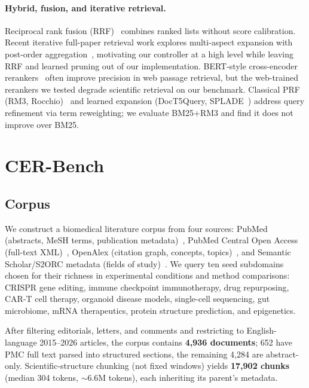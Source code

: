 \documentclass{article}
\begin{document}
\paragraph{Hybrid, fusion, and iterative retrieval.}
Reciprocal rank fusion (RRF)~\cite{rrf2009} combines ranked lists without score calibration. Recent iterative full-paper retrieval work explores multi-aspect expansion with post-order aggregation~\cite{cor2025}, motivating our controller at a high level while leaving RRF and learned pruning out of our implementation. BERT-style cross-encoder rerankers~\cite{nogueira2019bert} often improve precision in web passage retrieval, but the web-trained rerankers we tested degrade scientific retrieval on our benchmark. Classical PRF (RM3, Rocchio)~\cite{robertson2009} and learned expansion (DocT5Query, SPLADE~\cite{splade2022}) address query refinement via term reweighting; we evaluate BM25+RM3 and find it does not improve over BM25.

\section{CER-Bench}
\label{sec:benchmark}

\subsection{Corpus}

We construct a biomedical literature corpus from four sources: PubMed (abstracts, MeSH terms, publication metadata)~\cite{pubmed_nlm}, PubMed Central Open Access (full-text XML)~\cite{pmc_nlm}, OpenAlex (citation graph, concepts, topics)~\cite{openalex2022}, and Semantic Scholar/S2ORC metadata (fields of study)~\cite{s2orc2020}. We query ten seed subdomains chosen for their richness in experimental conditions and method comparisons: CRISPR gene editing, immune checkpoint immunotherapy, drug repurposing, CAR-T cell therapy, organoid disease models, single-cell sequencing, gut microbiome, mRNA therapeutics, protein structure prediction, and epigenetics.

After filtering editorials, letters, and comments and restricting to English-language 2015--2026 articles, the corpus contains \textbf{4{,}936 documents}; 652 have PMC full text parsed into structured sections, the remaining 4{,}284 are abstract-only. Scientific-structure chunking (not fixed windows) yields \textbf{17{,}902 chunks} (median 304 tokens, ${\sim}$6.6M tokens), each inheriting its parent's metadata.
\end{document}
